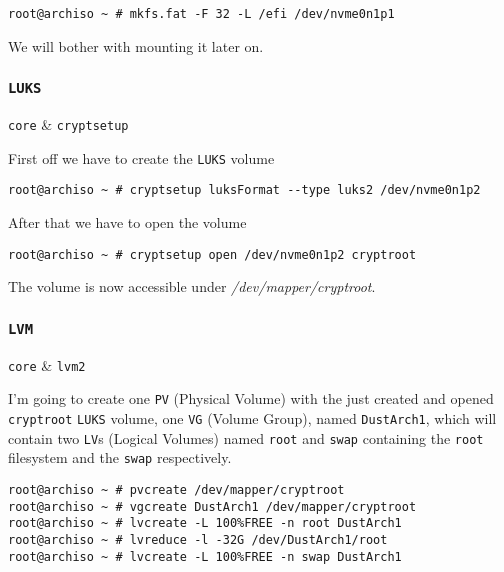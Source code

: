 \documentclass[10pt]{dustdoc}
\begin{document}
\begin{verbatim}
root@archiso ~ # mkfs.fat -F 32 -L /efi /dev/nvme0n1p1
\end{verbatim}

We will bother with mounting it later on.

\subsubsection{\texttt{LUKS}}
\label{sec:luks}

\begin{packagetable}
    \texttt{core} & \texttt{cryptsetup} \\ 
\end{packagetable}

First off we have to create the \texttt{LUKS} volume

\begin{verbatim}
root@archiso ~ # cryptsetup luksFormat --type luks2 /dev/nvme0n1p2
\end{verbatim}

After that we have to open the volume

\begin{verbatim}
root@archiso ~ # cryptsetup open /dev/nvme0n1p2 cryptroot
\end{verbatim}

The volume is now accessible under \textit{/dev/mapper/cryptroot}.

\subsubsection{\texttt{LVM}}
\label{sec:lvm}

\begin{packagetable}
    \texttt{core} & \texttt{lvm2} \\ 
\end{packagetable}

I’m going to create one \texttt{PV} (Physical Volume) with the just created and opened \texttt{cryptroot} \texttt{LUKS} volume, one \texttt{VG} (Volume Group), named \texttt{DustArch1}, which will contain two \texttt{LV}s (Logical Volumes) named \texttt{root} and \texttt{swap} containing the \texttt{root} filesystem and the \texttt{swap} respectively.

\begin{verbatim}
root@archiso ~ # pvcreate /dev/mapper/cryptroot
root@archiso ~ # vgcreate DustArch1 /dev/mapper/cryptroot
root@archiso ~ # lvcreate -L 100%FREE -n root DustArch1
root@archiso ~ # lvreduce -l -32G /dev/DustArch1/root
root@archiso ~ # lvcreate -L 100%FREE -n swap DustArch1
\end{verbatim}
\end{document}
